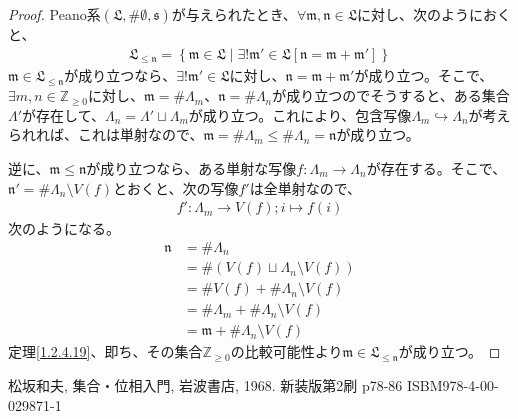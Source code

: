 \documentclass[dvipdfmx]{jsarticle}
\begin{document}
\begin{proof}
Peano系$\left( \mathfrak{L,}\# \emptyset ,\mathfrak{s} \right)$が与えられたとき、$\mathfrak{\forall m,n \in L}$に対し、次のようにおくと、
\begin{align*}
\mathfrak{L}_{\mathfrak{\leq n}} = \left\{ \mathfrak{m \in L} \middle| \exists!\mathfrak{m}'\in \mathfrak{L}\left[ \mathfrak{n = m +}\mathfrak{m}' \right] \right\}
\end{align*}
$\mathfrak{m \in}\mathfrak{L}_{\mathfrak{\leq n}}$が成り立つなら、$\exists!\mathfrak{m}'\in \mathfrak{L}$に対し、$\mathfrak{n = m +}\mathfrak{m}'$が成り立つ。そこで、$\exists m,n \in \mathbb{Z}_{\geq 0}$に対し、$\mathfrak{m} =\# \varLambda_{m}$、$\mathfrak{n} =\# \varLambda_{n}$が成り立つのでそうすると、ある集合$\varLambda'$が存在して、$\varLambda_{n} = \varLambda' \sqcup \varLambda_{m}$が成り立つ。これにより、包含写像$\varLambda_{m} \hookrightarrow \varLambda_{n}$が考えられれば、これは単射なので、$\mathfrak{m} = \# \varLambda_{m} \leq \# \varLambda_{n} = \mathfrak{n}$が成り立つ。\par
逆に、$\mathfrak{m \leq n}$が成り立つなら、ある単射な写像$f:\varLambda_{m} \rightarrow \varLambda_{n}$が存在する。そこで、$\mathfrak{n}' = \# {\varLambda_{n} \setminus V(f)}$とおくと、次の写像$f'$は全単射なので、
\begin{align*}
f':\varLambda_{m} \rightarrow V(f);i \mapsto f(i)
\end{align*}
次のようになる。
\begin{align*}
\mathfrak{n} &= \# \varLambda_{n}\\
&= \# \left( V(f) \sqcup \varLambda_{n} \setminus V(f) \right)\\
&= \# {V(f)} + \# {\varLambda_{n} \setminus V(f)}\\
&= \# \varLambda_{m} + \# {\varLambda_{n} \setminus V(f)}\\
&= \mathfrak{m} + \# {\varLambda_{n} \setminus V(f)}
\end{align*}
定理\ref{1.2.4.19}、即ち、その集合$\mathbb{Z}_{\geq 0}$の比較可能性より$\mathfrak{m \in}\mathfrak{L}_{\mathfrak{\leq n}}$が成り立つ。
\end{proof}
\begin{thebibliography}{50}
    松坂和夫, 集合・位相入門, 岩波書店, 1968. 新装版第2刷 p78-86 ISBM978-4-00-029871-1
\end{thebibliography}
\end{document}
